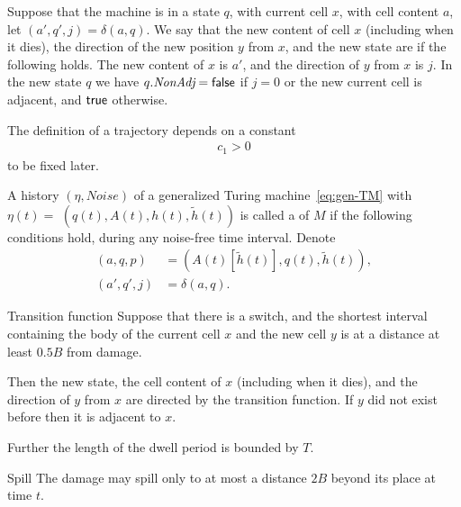 \documentclass[12pt]{memoir}
\newcommand{\fld}[1]{\ensuremath{\textit{#1}}}
\def\B{B}
\newcommand{\h}{h}
\newcommand{\hc}{\tilde h}
\newcommand{\Noise}{\mathit{Noise}}
\newcommand{\Tu}{T}
\newcommand{\NonAdj}{\fld{NonAdj}}
\begin{document}
\begin{definition}
Suppose that the machine is in a state \( q \), with current cell \( x \), 
with cell content \( a \), let \( (a',q',j) = \delta(a,q) \).
We say that the new content of cell \( x \) (including when it dies),
the direction of the new position \( y \) from \( x \),
and the new state are  if
the following holds.
The new content of \( x \) is \( a' \), and
the direction of \( y \) from \( x \) is \( j \).
In the new state \( q \) we have \( q.\NonAdj=\false \)
if \( j=0 \) or the new current cell is adjacent, and \( \hbox{\sffamily true} \) otherwise.  
\end{definition}

\begin{definition}[Trajectory]\label{def:traj}
The definition of a trajectory depends on a constant 
\begin{align*}
   c_{1}>0
 \end{align*}
to be fixed later.

\begin{sloppypar}
   A history  \( (\eta, \Noise) \) of a generalized Turing 
machine~\eqref{eq:gen-TM} with \(\eta(t) =\)
\( (q(t), A(t), \h(t), \hc(t)) \)
is called a  of \( M \) if the following conditions hold, during any 
noise-free time interval.
Denote 
\begin{align*}
     (a, q, p) &= (A(t)[\hc(t)], q(t),\hc(t)),
\\ (a',q',j)   &= \delta(a,q).
 \end{align*}
  \end{sloppypar}
\begin{flushdescription}

\item[Transition function]\label{i:def.traj.transition}
Suppose that there is a switch, and the shortest interval
containing the body of the current cell \( x \) and the
new cell \( y \) is at a distance at least \( 0.5\B \)
from damage.

Then the new state, the cell content of \( x \) (including when it dies), and
the direction of \( y \) from \( x \) are directed by the transition function.
If \( y \) did not exist before then it is adjacent to \( x \).

Further the length of the dwell period is bounded by \( \Tu \).

\item[Spill]\label{i:bound-on-damage}
  The damage may spill only to at most a distance \( 2\B \) beyond its 
place at time \( t \).


\end{flushdescription}
\end{definition}
\end{document}
